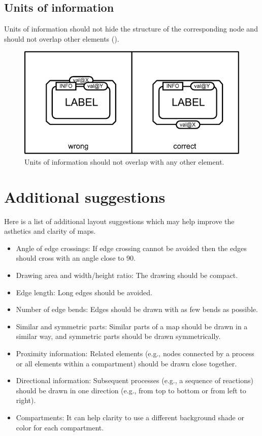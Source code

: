 \subsection{Units of information}

Units of information should not hide the structure of the
corresponding node and should not overlap other
elements ().

\begin{figure}[htb]
  \centering
  \includegraphics[scale=0.8]{images/build/layout_unit_information.pdf}
  \caption{Units of information should not overlap with any
  other element.}\label{fig:layout7}
\end{figure}

\section{Additional suggestions}
\label{sec:additional-suggestions}

Here is a list of additional layout suggestions which may help improve the asthetics and clarity of \PD maps.

\begin{itemize}
  \item Angle of edge crossings: If edge crossing cannot be avoided then the edges should cross with an angle close to 90\degree.
 \item Drawing area and width/height ratio: The drawing should
  be compact.
  \item Edge length: Long edges should be avoided.
  \item Number of edge bends: Edges should be drawn with
  as few bends as possible.
  \item Similar and symmetric parts: Similar parts of a map
  should be drawn in a similar way, and symmetric parts
  should be drawn symmetrically.
  \item Proximity information: Related elements (e.g., nodes
  connected by a process or all elements within a compartment)
  should be drawn close together.
  \item Directional information: Subsequent processes (e.g., a sequence
  of reactions) should be drawn in one direction (e.g., from
  top to bottom or from left to right).
  \item Compartments: It can help clarity to use a different background shade or color for each compartment.
\end{itemize}
